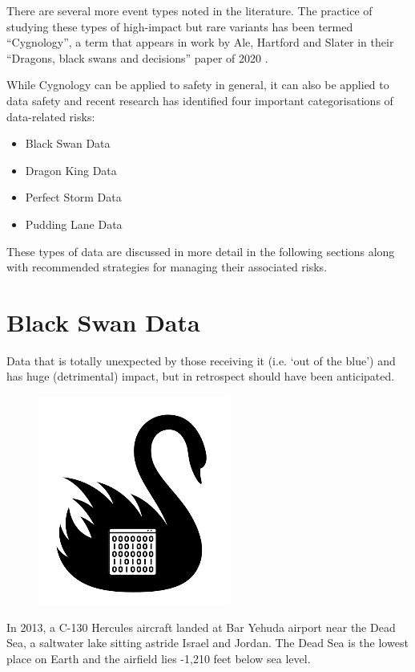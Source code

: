 There are several more event types noted in the literature.
The practice of studying these types of high-impact but rare variants has been termed “Cygnology”,
a term that appears in work by Ale, Hartford and Slater in their “Dragons,
black swans and decisions” paper of 2020 \cite{citation:cyg:dragons}.

While Cygnology can be applied to safety in general,
it can also be applied to data safety and recent research has identified four important
categorisations of data-related risks:
\begin{itemize}
\item Black Swan Data
\item Dragon King Data
\item Perfect Storm Data
\item Pudding Lane Data
\end{itemize}

These types of data are discussed in more detail in the following sections along with recommended strategies for managing their associated risks.

\section{Black Swan Data}
 Data that is totally unexpected by those receiving it (i.e. ‘out of the blue’) and has huge (detrimental) impact, but in retrospect should have been anticipated.

\begin{figure}
  \includegraphics{images/cygSwan}
\end{figure}

In 2013, a C-130 Hercules aircraft landed at Bar Yehuda airport near the Dead Sea, a saltwater lake sitting astride Israel and Jordan. The Dead Sea is the lowest place on Earth and the airfield lies -1,210 feet below sea level.

